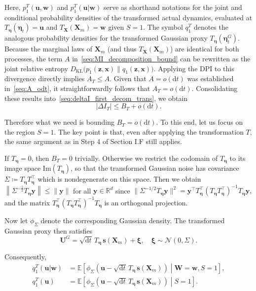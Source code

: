 \documentclass[
 longbibliography,
 twocolumn,
 superscriptaddress,
 amsmath,
 amssymb,
 amsthm,
 amsfonts,
 prl,
 floatfix,
]{revtex4-2}
\newcommand{\matbf}[1]{\boldsymbol{\mathsf{#1}}}
\begin{document}
\begin{widetext}
Here, $p_1^T(\bm u, \bm w)$ and $p_1^T(\bm u | \bm w)$ serve as shorthand notations for the joint and conditional probability densities of the transformed actual dynamics, evaluated at $T_{\bm\eta}(\bm\eta_t)=\bm u$ and $T_{\bm X}(\bm X_m)=\bm w$ given $S=1$. The symbol $q_1^T$ denotes the analogous probability densities for the transformed Gaussian proxy $T_{\bm\eta}(\bm\eta_t^G)$. 
Because the marginal laws of $\bm X_m$ (and thus $T_{\bm X}(\bm X_m)$) are identical for both processes, the term $A$ in~\eqref{seq:MI_decomposition_bound} can be rewritten as the joint relative entropy $D_{\mathrm{KL}}\big(p_1(\bm z,\bm x)\|q_1(\bm z,\bm x)\big)$. Applying the DPI to this divergence directly implies $A_T \le A$. Given that $A=o(\mathrm dt)$ was established in~\eqref{seq:A_odt}, it straightforwardly follows that $A_T=o(\mathrm dt)$. Consolidating these results into~\eqref{seq:deltaI_first_decom_trans}, we obtain
\[
    |\Delta I_T|\leq B_T+o(\mathrm dt).
\]

Therefore what we need is bounding $B_T=o(\mathrm dt)$. To this end, let us focus on the region $S=1$. The key point is that, even after applying the transformation $T$, the same argument as in Step 4 of Section I.F still applies.

If $T_{\bm\eta}=0$, then $B_T=0$ trivially. Otherwise we restrict the codomain of $T_{\bm\eta}$ to its image space $\mathrm{Im}(T_{\bm\eta})$, so that the transformed Gaussian noise has covariance $\matbf\Sigma\coloneq T_{\bm\eta}T_{\bm\eta}^\intercal$
which is nondegenerate on this space. Then we obtain 
$
    \left\|\matbf\Sigma^{-\frac{1}{2}}T_{\bm\eta}\bm y\right\|\leq\|\bm y\|
$ for all $\bm y\in\mathbb R^d$ since
$
    \| \matbf\Sigma^{-1/2}T_{\bm\eta}\bm y\|^2
    =\bm y^\intercal T_{\bm\eta}^\intercal (T_{\bm\eta}T_{\bm\eta}^\intercal)^{-1}
    T_{\bm\eta}\bm y,
$
and the matrix $T_{\bm\eta}^\intercal(T_{\bm\eta}T_{\bm\eta}^\intercal)^{-1}T_{\bm\eta}$ is an orthogonal projection.

Now let $\phi_{\Sigma}$ denote the corresponding Gaussian density. The transformed Gaussian proxy then satisfies
\begin{equation}
    \bm U^G=\sqrt{\mathrm dt}\,T_{\bm\eta}\,\bm s(\bm X_m)+\bm\xi,
    \quad\bm\xi\sim\mathcal N(0,\matbf\Sigma).
    \label{seq:U_G_gaussian}
\end{equation}

Consequently,
\begin{equation*}
    \begin{aligned}
        q_1^T(\bm u|\bm w)&=\mathbb E\!\left[
        \phi_\Sigma\left(\bm u-\sqrt{\mathrm dt}\,T_{\bm\eta}\,\bm s(\bm X_m)\right)
        \middle|
        \bm W=\bm w,S=1\right],
        \\
        q_1^T(\bm u)&=\mathbb E\!\left[
        \phi_\Sigma\left(\bm u-\sqrt{\mathrm dt}\,T_{\bm\eta}\,\bm s(\bm X_m)\right)
        \middle|
        S=1\right].
    \end{aligned}
\end{equation*}


\end{widetext}
\end{document}
